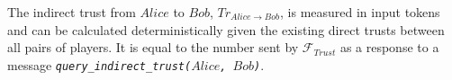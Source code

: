 \begin{definition}
  The indirect trust from $Alice$ to $Bob$, $Tr_{Alice \rightarrow Bob}$, is measured in input tokens and can be calculated
  deterministically given the existing direct trusts between all pairs of players. It is equal to the number sent by
  $\mathcal{F}_{Trust}$ as a response to a message \emph{\texttt{query\_indirect\_trust(}$Alice$\texttt{, }$Bob$\texttt{)}}.
\end{definition}

